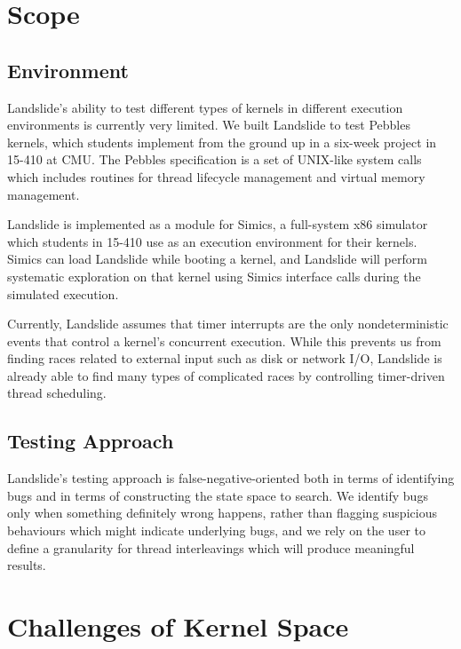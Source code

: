 \documentclass{llncs}
\begin{document}
\section{Scope}
\subsection{Environment}
\label{sec:environment}

Landslide's ability to test different types of kernels in different execution environments is currently very limited.
We built Landslide to test Pebbles kernels, which students implement from the ground up in a six-week project in 15-410 at CMU. The Pebbles specification is a set of UNIX-like system calls which includes routines for thread lifecycle management and virtual memory management.

Landslide is implemented as a module for Simics, a full-system x86 simulator which students in 15-410 use as an execution environment for their kernels. Simics can load Landslide while booting a kernel, and Landslide will perform systematic exploration on that kernel using Simics interface calls during the simulated execution.

Currently, Landslide assumes that timer interrupts are the only nondeterministic events that control a kernel's concurrent execution. While this prevents us from finding races related to external input such as disk or network I/O, Landslide is already able to find many types of complicated races by controlling timer-driven thread scheduling.

\subsection{Testing Approach}
\label{sec:approach}

Landslide's testing approach is false-negative-oriented both in terms of identifying bugs and in terms of constructing the state space to search. 
We identify bugs only when something definitely wrong happens, rather than flagging suspicious behaviours which might indicate underlying bugs, and we rely on the user to define a granularity for thread interleavings which will produce meaningful results.

\section{Challenges of Kernel Space}
\end{document}
